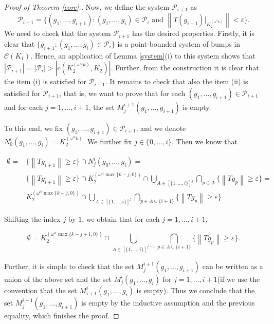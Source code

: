\documentclass{amsart}
\numberwithin{equation}{section}
\theoremstyle{definition}
\def\C{\mathcal C}
\def\ep{\varepsilon}
\newcommand{\norm}[1]{\left\|#1\right\|}
\newcommand{\abs}[1]{\left| #1  \right|}
\begin{document}
\begin{proof}[Proof of Theorem \ref{core}.]
Now, we define the system $\mathcal{P}_{i+1}$ as
\[\mathcal{P}_{i+1}=\{(g_1, \ldots, g_{i+1}):(g_1, \ldots, g_{i}) \in \mathcal{P}_i \text{ and } \norm{T(g_{i+1})|_{K_2^{(\omega^{\alpha }k)}}} <\ep \}.\]
We need to check that the system $\mathcal{P}_{i+1}$ has the desired properties. Firstly, it is clear that  $\{g_{i+1}: (g_1, \ldots, g_i) \in \mathcal{P}_i\}$ is a point-bounded system of bumps in $\C(K_1)$. Hence, an application of Lemma \ref{system}(i) to this system shows that $\abs{\mathcal{P}_{i+1}}=\abs{\mathcal{P}_{i}}>\abs{c(K_2^{(\omega^{\alpha} k)}, K_2)}$. Further, from the construction it is clear that the item (i) is satisfied for $\mathcal{P}_{i+1}$. It remains to check that also the item (ii) is satisfied for $\mathcal{P}_{i+1}$, that is, we want to prove that for each $(g_1, \ldots, g_{i+1}) \in \mathcal{P}_{i+1}$ and for each $j=1, \ldots, i+1$, the set $M_j^{i+1}(g_1, \ldots, g_{i+1})$ is empty.

To this end, we fix $(g_1, \ldots, g_{i+1}) \in \mathcal{P}_{i+1}$, and we denote $N_0^{i}(g_1, \ldots, g_{i})=K_2^{(\omega^{\alpha} k)}$. We further fix $j \in \{0, \ldots, i\}$. Then we know that

\begin{equation}
\nonumber
\begin{aligned}
\emptyset=&
\{\norm{Tg_{i+1}} \geq \ep\} \cap N_j^i(g_0, \ldots ,g_i)
=\\&
\{\norm{Tg_{i+1}} \geq \ep\} \cap K_2^{(\omega^{\alpha} \max\{k-j, 0\})} \cap \bigcup_{A\in[\{ 1,\dots,i\}]^j} \bigcap_{p \in A} \{ \norm{Tg_p} \geq \ep\}
=\\& K_2^{(\omega^{\alpha} \max\{k-j, 0\})} \cap \bigcup_{A\in[\{1,\dots,i\}]^{j}} \bigcap_{p \in A\cup\{i+1\}} \{ \norm{Tg_p} \geq \ep\}
\end{aligned}
\end{equation}

Shifting the index $j$ by $1$, we obtain that for each $j=1, \ldots, i+1$,

\[\emptyset=K_2^{(\omega^{\alpha} \max\{k-j+1, 0\})} \cap \bigcup_{A\in[\{1,\dots,i\}]^{j-1}} \bigcap_{p \in A \cup \{i+1\}} \{ \norm{Tg_p} \geq \ep\}.\]

Further, it is simple to check that the set $M_j^{i+1}(g_1, \ldots, g_{i+1})$ can be written as a union of the above set and the set $M_{j}^{i}(g_1, \ldots, g_{i})$ for $j=1, \ldots, i+1$(if we use the convention that the set $M_{i+1}^{i}(g_1, \ldots, g_{i})$ is empty).
Thus we conclude that the set $M_j^{i+1}(g_1, \ldots, g_{i+1})$ is empty by the inductive assumption and the previous equality, which finishes the proof.
\end{proof}
\end{document}
